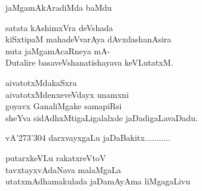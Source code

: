 \begin{entry}
\gl{}
\begin{shl}
jaMgamAkAradiMda baMdu
\end{shl}
\end{entry}

\begin{entry}
\begin{shl}
satata kAshimxVra deVshada\\
kiSxtipaM mahadeVvarAya dAvxdashanAsira\\
nuta jaMgamAcaRneya mA-\\
Dutalire basaveVshanatishayava keVLutatxM.
\end{shl}
\end{entry}

\begin{entry}
\begin{shl}
aivatotxMdakaSxra\\
aivatotxMdenxeveVdayx unamxni\\
goyavx GanaliMgake samapiRsi\\
sheYva sidAdhxMtigaLigalalxde jaDadigaLavaDadu.
\end{shl}
\end{entry}

\begin{entry}
\end{entry}

\begin{entry}
\gl{}
\begin{shl}
vA\char'273\char'304 darxvayxgaLu jaDaBakitx...........
\end{shl}
\end{entry}

\begin{entry}
\gl{}
\begin{shl}
putarxkeVLu rakatxreVtoV\\
tavxtayxvAdaNava malaMgaLa\\
utatxmAdhamakulada jaDamAyAma liMgagaLivu
\end{shl}
\end{entry}

